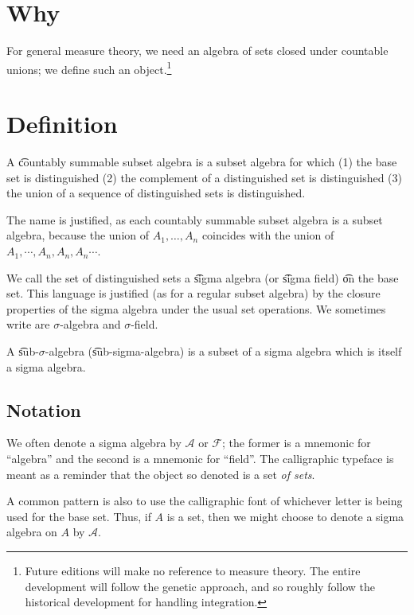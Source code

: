 

\section*{Why}

For general measure theory, we need an algebra of sets closed under countable unions; we define such an object.\footnote{Future editions will make no reference to measure theory. The entire development will follow the genetic approach, and so roughly follow the historical development for handling integration.}

\section*{Definition}

A \t{countably summable subset algebra} is a subset algebra for which (1) the base set is distinguished (2) the complement of a distinguished set is distinguished (3) the union of a sequence of distinguished sets is distinguished.

The name is justified, as each countably summable subset algebra is a subset algebra, because the union of $A_1, \dots , A_n$ coincides with the union of $A_1, \cdots, A_n, A_n, A_n \cdots$.

We call the set of distinguished sets a \t{sigma algebra} (or \t{sigma field}) \t{on} the base set.
This language is justified (as for a regular subset algebra) by the closure properties of the sigma algebra under the usual set operations.
We sometimes write are $\sigma $-algebra and $\sigma $-field.

A \t{sub-$\sigma $-algebra} (\t{sub-sigma-algebra}) is a subset of a sigma algebra which is itself a sigma algebra.

\subsection*{Notation}



We often denote a sigma algebra by $\mathcal{A} $ or $\mathcal{F} $; the former is a mnemonic for ``algebra'' and the second is a mnemonic for ``field''.
The calligraphic typeface is meant as a reminder that the object so denoted is a set \textit{of sets}.

A common pattern is also to use the calligraphic font of whichever letter is being used for the base set.
Thus, if $A$ is a set, then we might choose to denote a sigma algebra on $A$ by $\mathcal{A} $.

